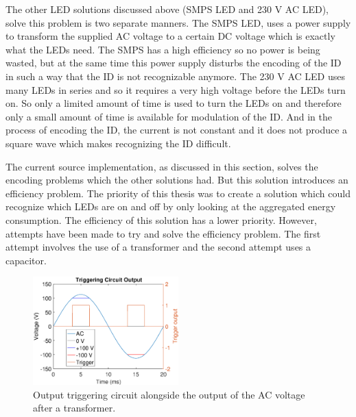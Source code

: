 	The other LED solutions discussed above (SMPS LED and 230 V AC LED), solve this problem is two separate manners.
	The SMPS LED, uses a power supply to transform the supplied AC voltage to a certain DC voltage which is exactly what the LEDs need.
	The SMPS has a high efficiency so no power is being wasted, but at the same time this power supply disturbs the encoding of the ID in such a way that the ID is not recognizable anymore.
	The 230 V AC LED uses many LEDs in series and so it requires a very high voltage before the LEDs turn on.
	So only a limited amount of time is used to turn the LEDs on and therefore only a small amount of time is available for modulation of the ID.
	And in the process of encoding the ID, the current is not constant and it does not produce a square wave which makes recognizing the ID difficult.


	The current source implementation, as discussed in this section, solves the encoding problems which the other solutions had.
	But this solution introduces an efficiency problem.
	The priority of this thesis was to create a solution which could recognize which LEDs are on and off by only looking at the aggregated energy consumption.
	The efficiency of this solution has a lower priority. %
	However, attempts have been made to try and solve the efficiency problem.
	The first attempt involves the use of a transformer and the second attempt uses a capacitor.

	\begin{figure}[htb]
		\centering
		\includegraphics[angle=0,width=0.5\textwidth]{chapters/hardware-chapters/AC/ac-modulator/custom-hardware/ac-current-source/ac-wave-lower-transformed-triggering.eps}
		\caption{Output triggering circuit alongside the output of the AC voltage after a transformer.}
		\label{fig:trigger-output-lower-transformed}
	\end{figure}


